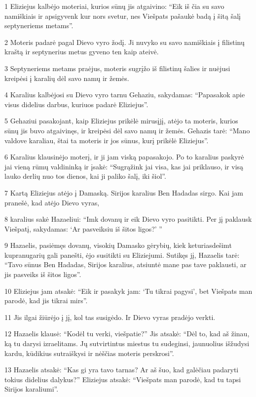 \par 1 Eliziejus kalbėjo moteriai, kurios sūnų jis atgaivino: “Eik iš čia su savo namiškiais ir apsigyvenk kur nors svetur, nes Viešpats pašaukė badą į šitą šalį septyneriems metams”. 
\par 2 Moteris padarė pagal Dievo vyro žodį. Ji nuvyko su savo namiškiais į filistinų kraštą ir septynerius metus gyveno ten kaip ateivė. 
\par 3 Septyneriems metams praėjus, moteris sugrįžo iš filistinų šalies ir nuėjusi kreipėsi į karalių dėl savo namų ir žemės. 
\par 4 Karalius kalbėjosi su Dievo vyro tarnu Gehaziu, sakydamas: “Papasakok apie visus didelius darbus, kuriuos padarė Eliziejus”. 
\par 5 Gehaziui pasakojant, kaip Eliziejus prikėlė mirusįjį, atėjo ta moteris, kurios sūnų jis buvo atgaivinęs, ir kreipėsi dėl savo namų ir žemės. Gehazis tarė: “Mano valdove karaliau, štai ta moteris ir jos sūnus, kurį prikėlė Eliziejus”. 
\par 6 Karalius klausinėjo moterį, ir ji jam viską papasakojo. Po to karalius paskyrė jai vieną rūmų valdininką ir įsakė: “Sugrąžink jai visa, kas jai priklauso, ir visą lauko derlių nuo tos dienos, kai ji paliko šalį, iki šiol”. 
\par 7 Kartą Eliziejus atėjo į Damaską. Sirijos karalius Ben Hadadas sirgo. Kai jam pranešė, kad atėjo Dievo vyras, 
\par 8 karalius sakė Hazaeliui: “Imk dovanų ir eik Dievo vyro pasitikti. Per jį paklausk Viešpatį, sakydamas: ‘Ar pasveiksiu iš šitos ligos?’ ” 
\par 9 Hazaelis, pasiėmęs dovanų, visokių Damasko gėrybių, kiek keturiasdešimt kupranugarių gali panešti, ėjo susitikti su Eliziejumi. Sutikęs jį, Hazaelis tarė: “Tavo sūnus Ben Hadadas, Sirijos karalius, atsiuntė mane pas tave paklausti, ar jis pasveiks iš šitos ligos”. 
\par 10 Eliziejus jam atsakė: “Eik ir pasakyk jam: ‘Tu tikrai pagysi’, bet Viešpats man parodė, kad jis tikrai mirs”. 
\par 11 Jis ilgai žiūrėjo į jį, kol tas susigėdo. Ir Dievo vyras pradėjo verkti. 
\par 12 Hazaelis klausė: “Kodėl tu verki, viešpatie?” Jis atsakė: “Dėl to, kad aš žinau, ką tu darysi izraelitams. Jų sutvirtintus miestus tu sudeginsi, jaunuolius išžudysi kardu, kūdikius sutraiškysi ir nėščias moteris perskrosi”. 
\par 13 Hazaelis atsakė: “Kas gi yra tavo tarnas? Ar aš šuo, kad galėčiau padaryti tokius didelius dalykus?” Eliziejus atsakė: “Viešpats man parodė, kad tu tapsi Sirijos karaliumi”. 
